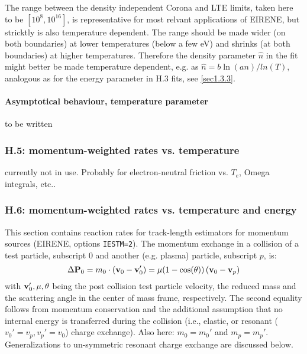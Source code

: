 \documentclass[12pt,dvipdfmx]{article}
\begin{document}
The range between the density independent Corona and LTE limits, taken here to be
$[10^8 ,10^{16}]$,  is representative for most relvant applications of EIRENE, but stricktly is also temperature dependent.
The range should be made wider (on both boundaries) at lower temperatures (below a few eV)  and shrinks
(at both boundaries) at higher temperatures. Therefore the density parameter $\hat n$ in the fit might better be made
temperature dependent, e.g. as $\hat n = b \ln(a n)/ln(T)$, analogous as for the energy parameter in H.3 fits, see \ref{sec1.3.3}.

\paragraph{Asymptotical behaviour, temperature parameter}
to be written

\subsubsection{H.5: momentum-weighted rates vs. temperature}\label{sec1.3.5}
currently not in use. Probably for electron-neutral friction vs. $T_e$, Omega integrals, etc..

\subsubsection{H.6: momentum-weighted rates vs. temperature and energy}\label{sec1.3.6}
This section  contains reaction rates for track-length estimators for momentum sources (EIRENE, options {\tt IESTM=2}).
The momentum exchange in a collision of a test particle, subscript $0$ and another (e.g. plasma) particle, subscript $p$,
is:
\begin{equation}
\Delta {\bf P}_0 = m_0 \cdot \left({\bf v}_0-{\bf v}'_0\right) = \mu (1-\cos(\theta)) \left({\bf v}_0-{\bf v}_p\right)
\end{equation}
with ${\bf v}_0', \mu, \theta$ being the post collision test particle velocity,
the reduced mass and the scattering angle in the center of mass frame, respectively.
The second equality follows from momentum conservation
and the additional assumption that no internal energy is transferred during
the collision (i.e., elastic, or resonant ($v_0'=v_p , v_p'=v_0$) charge exchange). Also here:  $m_0 = m_0'$ and $m_p = m_p'$. Generalizations to un-symmetric
resonant charge exchange are discussed below.
\end{document}
